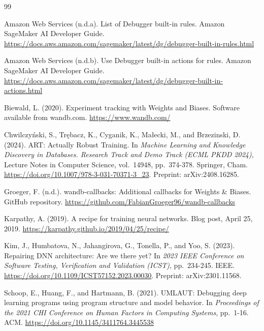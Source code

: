\begin{thebibliography}{99}

Amazon Web Services (n.d.a).
\newblock List of Debugger built-in rules.
\newblock Amazon SageMaker AI Developer Guide.
\newblock \url{https://docs.aws.amazon.com/sagemaker/latest/dg/debugger-built-in-rules.html}

Amazon Web Services (n.d.b).
\newblock Use Debugger built-in actions for rules.
\newblock Amazon SageMaker AI Developer Guide.
\newblock \url{https://docs.aws.amazon.com/sagemaker/latest/dg/debugger-built-in-actions.html}

Biewald, L. (2020).
\newblock Experiment tracking with Weights and Biases.
\newblock Software available from wandb.com.
\newblock \url{https://www.wandb.com/}

Chwilczy\'nski, S., Tr\k{e}bacz, K., Cyganik, K., Ma\l{}ecki, M., and Brzezinski, D. (2024).
\newblock ART: Actually Robust Training.
\newblock In \emph{Machine Learning and Knowledge Discovery in Databases. Research Track and Demo Track (ECML PKDD 2024)}, Lecture Notes in Computer Science, vol.~14948, pp.~374-378. Springer, Cham.
\newblock \url{https://doi.org/10.1007/978-3-031-70371-3_23}. Preprint: arXiv:2408.16285.

Groeger, F. (n.d.).
\newblock wandb-callbacks: Additional callbacks for Weights \& Biases.
\newblock GitHub repository.
\newblock \url{https://github.com/FabianGroeger96/wandb-callbacks}

Karpathy, A. (2019).
\newblock A recipe for training neural networks.
\newblock Blog post, April 25, 2019.
\newblock \url{https://karpathy.github.io/2019/04/25/recipe/}

Kim, J., Humbatova, N., Jahangirova, G., Tonella, P., and Yoo, S. (2023).
\newblock Repairing DNN architecture: Are we there yet?
\newblock In \emph{2023 IEEE Conference on Software Testing, Verification and Validation (ICST)}, pp.~234-245. IEEE.
\newblock \url{https://doi.org/10.1109/ICST57152.2023.00030}. Preprint: arXiv:2301.11568.

Schoop, E., Huang, F., and Hartmann, B. (2021).
\newblock UMLAUT: Debugging deep learning programs using program structure and model behavior.
\newblock In \emph{Proceedings of the 2021 CHI Conference on Human Factors in Computing Systems}, pp.~1-16. ACM.
\newblock \url{https://doi.org/10.1145/3411764.3445538}


\end{thebibliography}
